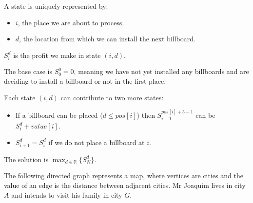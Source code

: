 \documentclass{cal}
\begin{document}
{\ansseparator

A state is uniquely represented by:
\begin{itemize}
    \item $i$, the place we are about to process.
    \item $d$, the location from which we can install the next billboard.
\end{itemize}

$S_i^d$ is the profit we make in state $(i,d)$.

The base case is $S_0^0 = 0$, meaning we have not yet installed any billboards and are deciding to install a billboard or not in the first place.

Each state $(i,d)$ can contribute to two more states:
\begin{itemize}
    \item If a billboard can be placed ($d \leq pos[i]$) then $S_{i+1}^{pos[i]+5-1}$ can be $S_i^d + value[i]$.
    \item $S_{i+1}^d = S_i^d$ if we do not place a billboard at $i$.
\end{itemize}

The solution is $\max_{d \in \mathbb{R}}\{S_{N}^d\}$.

\newpage


The following directed graph represents a map, where vertices are cities and the value of an edge is the distance between adjacent cities. Mr Joaquim lives in city $A$ and intends to visit his family in city $G$.

\begin{center}
\end{center}}
\end{document}
